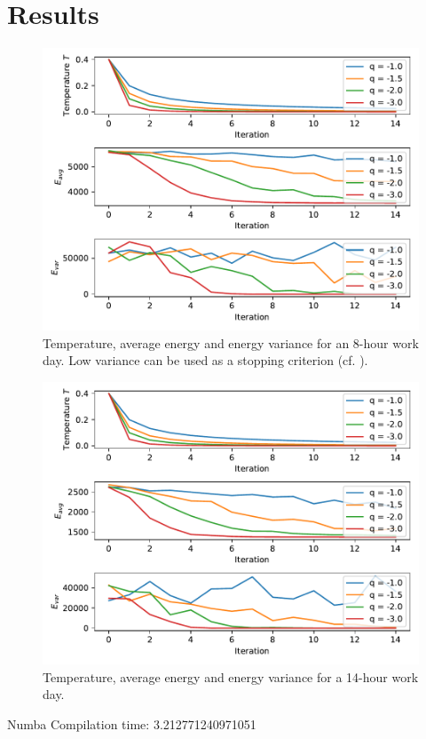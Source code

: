 \documentclass{prettytex/ox/mmsc-special-topic}
\begin{document}
  \section{Results}
  \begin{figure}[H]
    \centering
    \includegraphics[width=0.8\linewidth]{results/convergence-8h-day.pdf}
    \caption{Temperature, average energy and energy variance for an 8-hour work day. Low variance can be used as a stopping criterion (cf. ).}
  \end{figure}
  \begin{figure}[H]
    \centering
    \includegraphics[width=0.8\linewidth]{results/convergence-14h-day.pdf}
    \caption{Temperature, average energy and energy variance for a 14-hour work day.}
  \end{figure}

  Numba Compilation time: 3.212771240971051
\end{document}
